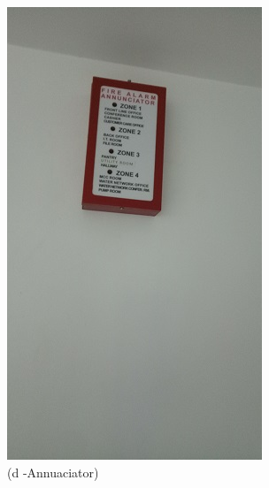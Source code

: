 \begin{figure}
\begin{minipage}[b]{0.2\linewidth}
		\includegraphics[width=\textwidth]{figures/R1P_fdas/annunciator}
	\caption*{(d -Annuaciator)}
\end{minipage}
	\hspace{0.05cm}
\begin{minipage}[b]{0.2\linewidth}
	\centering

\end{minipage}
\end{figure}
